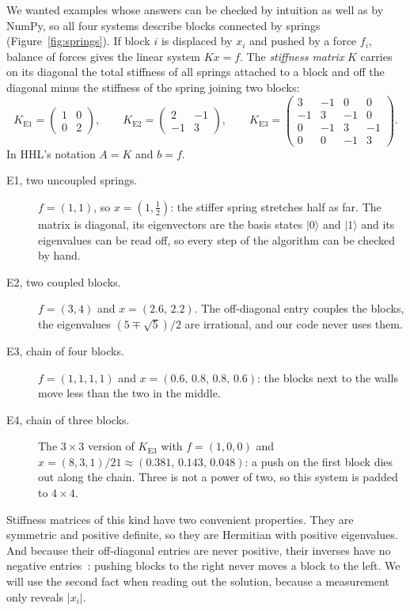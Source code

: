 \documentclass[manuscript,screen,review,nonacm]{acmart}
\newcommand{\ket}[1]{\lvert #1\rangle}
\begin{document}
We wanted examples whose answers can be checked by intuition as well as by
NumPy, so all four systems describe blocks connected by springs
(Figure~\ref{fig:springs}). If block $i$ is displaced by $x_i$ and pushed by a
force $f_i$, balance of forces gives the linear system $Kx=f$. The
\emph{stiffness matrix} $K$ carries on its diagonal the total stiffness of all
springs attached to a block and off the diagonal minus the stiffness of the
spring joining two blocks:
\begin{equation}
  K_{\mathrm{E1}}=\begin{pmatrix}1&0\\0&2\end{pmatrix},\qquad
  K_{\mathrm{E2}}=\begin{pmatrix}2&-1\\-1&3\end{pmatrix},\qquad
  K_{\mathrm{E3}}=\begin{pmatrix}3&-1&0&0\\-1&3&-1&0\\0&-1&3&-1\\0&0&-1&3\end{pmatrix}.
  \label{eq:matrices}
\end{equation}
In HHL's notation $A=K$ and $b=f$.
\begin{description}
\item[E1, two uncoupled springs.] $f=(1,1)$, so $x=(1,\tfrac12)$: the stiffer
  spring stretches half as far. The matrix is diagonal, its eigenvectors are
  the basis states $\ket{0}$ and $\ket{1}$ and its eigenvalues can be read
  off, so every step of the algorithm can be checked by hand.
\item[E2, two coupled blocks.] $f=(3,4)$ and $x=(2.6,\,2.2)$. The off-diagonal
  entry couples the blocks, the eigenvalues $(5\mp\sqrt5)/2$ are irrational,
  and our code never uses them.
\item[E3, chain of four blocks.] $f=(1,1,1,1)$ and $x=(0.6,\,0.8,\,0.8,\,0.6)$:
  the blocks next to the walls move less than the two in the middle.
\item[E4, chain of three blocks.] The $3\times 3$ version of $K_{\mathrm{E3}}$
  with $f=(1,0,0)$ and $x=(8,3,1)/21\approx(0.381,\,0.143,\,0.048)$: a push on
  the first block dies out along the chain. Three is not a power of two, so
  this system is padded to $4\times 4$.
\end{description}
Stiffness matrices of this kind have two convenient properties. They are
symmetric and positive definite, so they are Hermitian with positive
eigenvalues. And because their off-diagonal entries are never positive, their
inverses have no negative entries~\cite{berman1994}: pushing blocks to the
right never moves a block to the left. We will use the second fact when
reading out the solution, because a measurement only reveals $|x_i|$.
\end{document}
